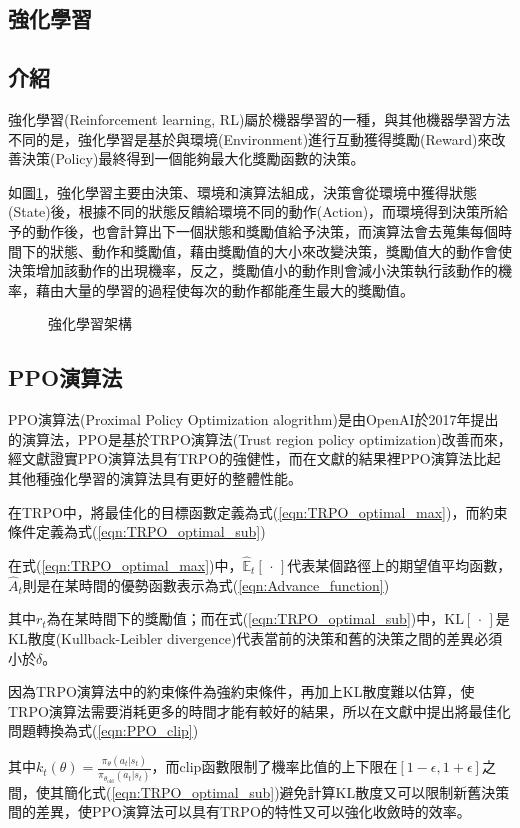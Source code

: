 \documentclass[a4paper, onecolumn, 11pt, AutoFakeBold]{article}
\newcommand{\figref}[1]{圖\ref{#1}}
\renewcommand{\eqref}[1]{式(\ref{#1})}
\begin{document}
\begin{multicols*}{2}
\smallskip
\section{強化學習}
\subsection{介紹}
\par
強化學習(Reinforcement learning, RL)屬於機器學習的一種，與其他機器學習方法不同的是，強化學習是基於與環境(Environment)進行互動獲得獎勵(Reward)來改善決策(Policy)最終得到一個能夠最大化獎勵函數的決策。
\par
如\figref{fig:RL_architecture}，強化學習主要由決策、環境和演算法組成，決策會從環境中獲得狀態(State)後，根據不同的狀態反饋給環境不同的動作(Action)，而環境得到決策所給予的動作後，也會計算出下一個狀態和獎勵值給予決策，而演算法會去蒐集每個時間下的狀態、動作和獎勵值，藉由獎勵值的大小來改變決策，獎勵值大的動作會使決策增加該動作的出現機率，反之，獎勵值小的動作則會減小決策執行該動作的機率，藉由大量的學習的過程使每次的動作都能產生最大的獎勵值。
\begin{figure}[H]
    \centering
    
    \caption{強化學習架構}
    \label{fig:RL_architecture}
\end{figure}

\smallskip
\subsection{PPO演算法}
\par
PPO演算法(Proximal Policy Optimization alogrithm)是由OpenAI於2017年提出的演算法，PPO是基於TRPO演算法(Trust region policy optimization)改善而來，經文獻\cite{PPO_algorithms}證實PPO演算法具有TRPO的強健性，而在文獻\cite{PPO_algorithms}的結果裡PPO演算法比起其他種強化學習的演算法具有更好的整體性能。
\par
在TRPO中，將最佳化的目標函數定義為\eqref{eqn:TRPO_optimal_max}，而約束條件定義為\eqref{eqn:TRPO_optimal_sub}

\noindent 在\eqref{eqn:TRPO_optimal_max}中，$\hat{\mathbb{E}}_t[\,\cdot\,]$代表某個路徑上的期望值平均函數，$\hat{A}_t$則是在某時間的優勢函數表示為\eqref{eqn:Advance_function}

\noindent 其中$r_t$為在某時間下的獎勵值；而在\eqref{eqn:TRPO_optimal_sub}中，$\text{KL}[\,\cdot\,]$是KL散度(Kullback-Leibler divergence)代表當前的決策和舊的決策之間的差異必須小於$\delta$。
\par
因為TRPO演算法中的約束條件為強約束條件，再加上KL散度難以估算，使TRPO演算法需要消耗更多的時間才能有較好的結果，所以在文獻\cite{PPO_algorithms}中提出將最佳化問題轉換為\eqref{eqn:PPO_clip}

\noindent 其中$k_t(\theta)=\frac{\pi_{\theta}(a_t|s_t)}{\pi_{\theta_\text{old}}(a_t|s_t)}$，而clip函數限制了機率比值的上下限在$\left[1-\epsilon, 1+\epsilon\right]$之間，使其簡化\eqref{eqn:TRPO_optimal_sub}避免計算KL散度又可以限制新舊決策間的差異，使PPO演算法可以具有TRPO的特性又可以強化收斂時的效率。


\end{multicols*}
\end{document}
